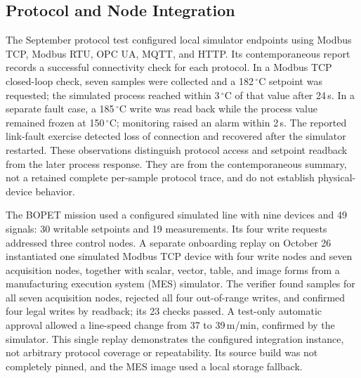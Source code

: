 \subsection{Protocol and Node Integration}
The September protocol test configured local simulator endpoints using Modbus
TCP, Modbus RTU, OPC UA, MQTT, and HTTP. Its contemporaneous report records a
successful connectivity check for each protocol. In a Modbus TCP closed-loop
check, seven samples were collected and a 182\,$^{\circ}$C setpoint was
requested; the simulated process reached within 3\,$^{\circ}$C of that value
after 24\,s. In a separate fault case, a 185\,$^{\circ}$C write was read back
while the process value remained frozen at 150\,$^{\circ}$C; monitoring raised
an alarm within 2\,s. The reported link-fault exercise detected loss of
connection and recovered after the simulator restarted. These observations
distinguish protocol access and setpoint readback from the later process
response. They are from the contemporaneous summary, not a retained complete
per-sample protocol trace, and do not establish physical-device behavior.

The BOPET mission used a configured simulated line with nine devices and 49
signals: 30 writable setpoints and 19 measurements. Its four write requests
addressed three control nodes. A separate onboarding replay on October 26
instantiated one simulated Modbus TCP device with four write nodes and seven
acquisition nodes, together with scalar, vector, table, and image forms from a
manufacturing execution system (MES) simulator. The verifier found samples
for all seven acquisition nodes, rejected all four out-of-range writes, and
confirmed four legal writes by readback; its 23 checks passed. A test-only
automatic approval allowed a line-speed change from 37 to 39\,m/min, confirmed
by the simulator. This single replay demonstrates the configured integration
instance, not arbitrary protocol coverage or repeatability. Its source build
was not completely pinned, and the MES image used a local storage fallback.

